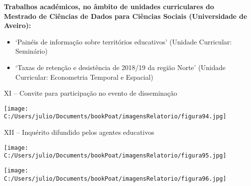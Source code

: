 \documentclass[
]{book}
\begin{document}
\textbf{Trabalhos académicos, no âmbito de unidades curriculares do Mestrado de Ciências de Dados para Ciências Sociais (Universidade de Aveiro):}

\begin{itemize}
\item
  `Painéis de informação sobre territórios educativos' (Unidade Curricular: Seminário)
\item
  `Taxas de retenção e desistência de 2018/19 da região Norte' (Unidade Curricular: Econometria Temporal e Espacial)
\end{itemize}

XI -- Convite para participação no evento de disseminação

\texttt{[image: C:/Users/julio/Documents/bookPoat/imagensRelatorio/figura94.jpg]}

XII -- Inquérito difundido pelos agentes educativos

\texttt{[image: C:/Users/julio/Documents/bookPoat/imagensRelatorio/figura95.jpg]}

\texttt{[image: C:/Users/julio/Documents/bookPoat/imagensRelatorio/figura96.jpg]}

  
\end{document}
